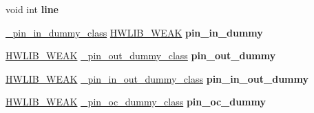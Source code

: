 \begin{DoxyCompactItemize}
\item 
void int {\bfseries line}
\item 
\hyperlink{classhwlib_1_1__pin__in__dummy__class}{\+\_\+pin\+\_\+in\+\_\+dummy\+\_\+class} \hyperlink{hwlib-defines_8hpp_a04be4340016df60d6636c1d1c6d94fc9}{H\+W\+L\+I\+B\+\_\+\+W\+E\+AK} {\bfseries pin\+\_\+in\+\_\+dummy}\hypertarget{namespacehwlib_af4a61043143177f6af8e0284e4524433}{}\label{namespacehwlib_af4a61043143177f6af8e0284e4524433}

\item 
\hyperlink{hwlib-defines_8hpp_a04be4340016df60d6636c1d1c6d94fc9}{H\+W\+L\+I\+B\+\_\+\+W\+E\+AK} \hyperlink{classhwlib_1_1__pin__out__dummy__class}{\+\_\+pin\+\_\+out\+\_\+dummy\+\_\+class} {\bfseries pin\+\_\+out\+\_\+dummy}\hypertarget{namespacehwlib_acaf0b10a2f1c9765e1b91a98453adb20}{}\label{namespacehwlib_acaf0b10a2f1c9765e1b91a98453adb20}

\item 
\hyperlink{hwlib-defines_8hpp_a04be4340016df60d6636c1d1c6d94fc9}{H\+W\+L\+I\+B\+\_\+\+W\+E\+AK} \hyperlink{classhwlib_1_1__pin__in__out__dummy__class}{\+\_\+pin\+\_\+in\+\_\+out\+\_\+dummy\+\_\+class} {\bfseries pin\+\_\+in\+\_\+out\+\_\+dummy}\hypertarget{namespacehwlib_a166a4bea8640903b2141ede3e703eb60}{}\label{namespacehwlib_a166a4bea8640903b2141ede3e703eb60}

\item 
\hyperlink{hwlib-defines_8hpp_a04be4340016df60d6636c1d1c6d94fc9}{H\+W\+L\+I\+B\+\_\+\+W\+E\+AK} \hyperlink{classhwlib_1_1__pin__oc__dummy__class}{\+\_\+pin\+\_\+oc\+\_\+dummy\+\_\+class} {\bfseries pin\+\_\+oc\+\_\+dummy}\hypertarget{namespacehwlib_a297be6e8b97db1f338641a5d2864e741}{}\label{namespacehwlib_a297be6e8b97db1f338641a5d2864e741}

\end{DoxyCompactItemize}
{\bf }\par

